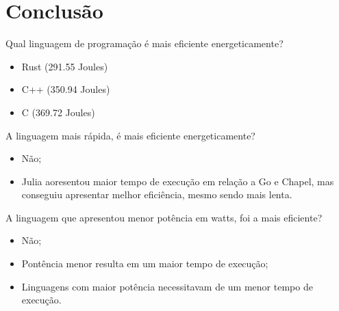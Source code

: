 \section{Conclusão}

\begin{frame}{Qual linguagem de programação é mais eficiente energeticamente?}
    \begin{itemize}
        \item Rust (291.55 Joules)
        \item C++ (350.94 Joules)
        \item C (369.72 Joules)
    \end{itemize}
\end{frame}

\begin{frame}{A linguagem mais rápida, é mais eficiente energeticamente?}
    \begin{itemize}
        \item Não;
        \item Julia aoresentou maior tempo de execução em relação a Go e Chapel, mas conseguiu apresentar melhor eficiência, mesmo sendo mais lenta.
    \end{itemize}
\end{frame}

\begin{frame}{A linguagem que apresentou menor potência em watts, foi a mais eficiente?}
    \begin{itemize}
        \item Não;
        \item Pontência menor resulta em um maior tempo de execução;
        \item Linguagens com maior potência necessitavam de um menor tempo de execução.
    \end{itemize}
\end{frame}


